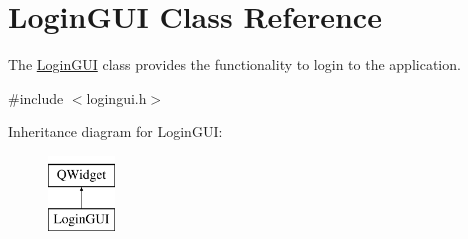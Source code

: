 \hypertarget{classLoginGUI}{}\section{Login\+G\+UI Class Reference}
\label{classLoginGUI}


The \hyperlink{classLoginGUI}{Login\+G\+UI} class provides the functionality to login to the application.  




{\ttfamily \#include $<$logingui.\+h$>$}

Inheritance diagram for Login\+G\+UI\+:\begin{figure}[H]
\begin{center}
\leavevmode
\includegraphics[height=2.000000cm]{classLoginGUI}
\end{center}
\end{figure}
